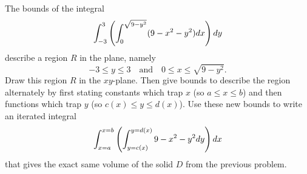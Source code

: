 \begin{problem}
 The bounds of the integral 
$$\displaystyle\int_{-3}^{3} \left(\int_0^{\sqrt{9-y^2}}(9-x^2-y^2) dx\right) dy$$ 
describe a region $R$ in the plane, namely $$-3\leq y\leq 3 \quad\text{and}\quad 0\leq x\leq \sqrt{9-y^2}.$$  Draw this region $R$ in the $xy$-plane. Then give bounds to describe the region alternately by first stating constants which trap $x$ (so $a\leq x\leq b$) and then functions which trap $y$ (so $c(x)\leq y \leq d(x)$). Use these new bounds to write an iterated integral 
 $$\displaystyle\int_{x=a}^{x=b} \left(\int_{y=c(x)}^{y=d(x)}9-x^2-y^2 dy\right) dx$$   
 that gives the exact same volume of the solid $D$ from the previous problem.
\end{problem}


